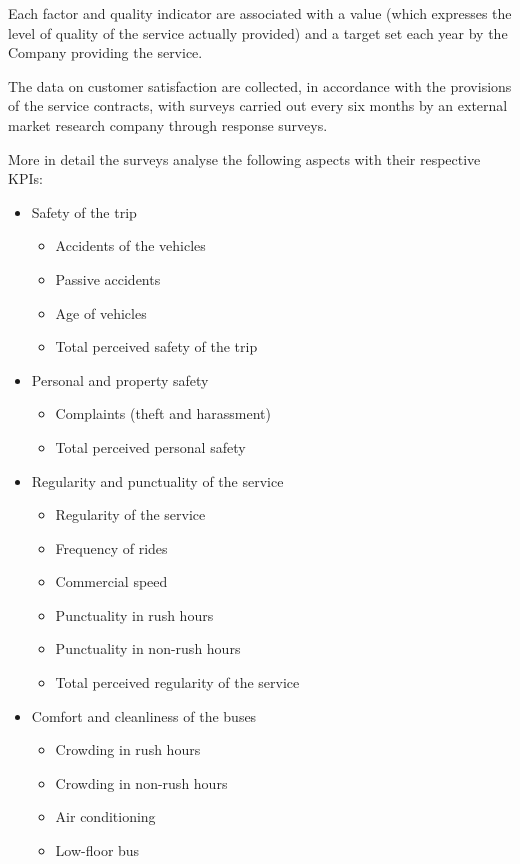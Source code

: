 Each factor and quality indicator are associated with a value (which expresses the level of quality of the service actually provided) and a target set each year by the Company providing the service.

The data on customer satisfaction are collected, in accordance with the provisions of the service contracts, with surveys carried out every six months by an external market research company through response surveys. 

More in detail the surveys  analyse the following aspects with their respective KPIs:
\begin{itemize}
    \item Safety of the trip
\begin{itemize}
    \item	Accidents of the vehicles
    \item Passive accidents
    \item Age of vehicles
    \item Total perceived safety of the trip
\end{itemize}
    \item Personal and property safety
    \begin{itemize}
        \item	Complaints (theft and harassment)
        \item Total perceived personal safety
    \end{itemize}
    \item Regularity and punctuality of the service
    \begin{itemize}
        \item 	Regularity of the service
        \item Frequency of rides
        \item Commercial speed
        \item Punctuality in rush hours
        \item Punctuality in non-rush hours
        \item Total perceived regularity of the service
    \end{itemize}
    \item	Comfort and cleanliness of the buses
    \begin{itemize}
        \item Crowding in rush hours 
        \item Crowding in non-rush hours 
        \item Air conditioning
        \item Low-floor bus

\end{itemize}
\end{itemize}
